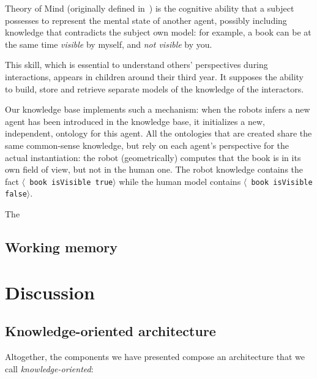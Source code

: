 \documentclass[letterpaper, 10 pt, conference]{ieeeconf}  %
\newcommand{\stmt}[1]{{\footnotesize \tt $\langle$ #1\relax$\rangle$}}
\begin{document}
Theory of Mind (originally defined in~\cite{Premack1978}) is the cognitive
ability that a subject possesses to represent the mental state of another
agent, possibly including knowledge that contradicts the subject own model: for
example, a book can be at the same time \emph{visible} by myself, and \emph{not
visible} by you.

This skill, which is essential to understand others' perspectives during
interactions, appears in children around their third year. It supposes the ability to build, store and retrieve separate models of the knowledge of the interactors.

Our knowledge base implements such a mechanism: when the robots infers a new
agent has been introduced in the knowledge base, it initializes a new,
independent, ontology for this agent. All the ontologies that are created share
the same common-sense knowledge, but rely on each agent's perspective for the
actual instantiation: the robot (geometrically) computes that the book is in
its own field of view, but not in the human one. The robot knowledge contains
the fact \stmt{book isVisible true} while the human model contains \stmt{book
isVisible false}.

The \cite{Warnier2012a}

\subsection{Working memory}

\section{Discussion}
\label{sect|conclusion}

\subsection{Knowledge-oriented architecture}

Altogether, the components we have presented compose an architecture that we
call \emph{knowledge-oriented}:
\end{document}
